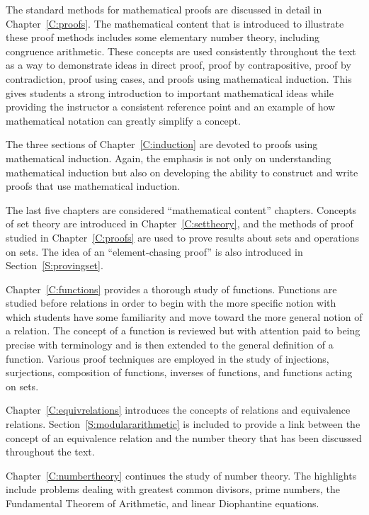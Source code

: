The standard methods for mathematical proofs are discussed in detail in Chapter~\ref{C:proofs}.  The mathematical content that is introduced to illustrate these proof methods includes some elementary number theory, including congruence arithmetic.  These concepts are used consistently throughout the text as a way to demonstrate ideas in direct proof, proof by contrapositive, proof by contradiction, proof using cases, and proofs using mathematical induction.  This gives students a strong introduction to important mathematical ideas while providing the instructor a consistent reference point and an example of how mathematical notation can greatly simplify a concept.

The three sections of Chapter~\ref{C:induction} are devoted to proofs using mathematical induction.  Again, the emphasis is not only on understanding mathematical induction but also on developing the ability to construct and write proofs that use mathematical induction.




The last five chapters are considered ``mathematical content'' chapters.     Concepts of set theory are introduced in Chapter~\ref{C:settheory}, and the methods of proof studied in Chapter~\ref{C:proofs} are used to prove results about sets and operations on sets.  The idea of an ``element-chasing proof'' is also introduced in Section~\ref{S:provingset}.

Chapter~\ref{C:functions} provides a thorough study of functions.  Functions are studied before relations in order to begin with the more specific notion with which students have some familiarity and move toward the more general notion of a relation.  The concept of a function is reviewed but with attention paid to being precise with terminology and is then extended to the general definition of a function.  Various proof techniques are employed in the study of injections, surjections, composition of functions,  inverses of functions, and functions acting on sets.  

Chapter~\ref{C:equivrelations} introduces the concepts of relations and equivalence relations.  %
Section~\ref{S:modulararithmetic} is included to provide a link between the concept of an equivalence relation and the number theory that has been discussed throughout the text.  

Chapter~\ref{C:numbertheory} continues the study of number theory.  The highlights include problems dealing with greatest common divisors, prime numbers, the Fundamental Theorem of Arithmetic, and linear Diophantine equations.  

